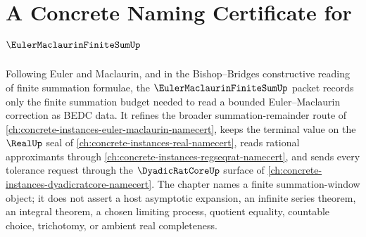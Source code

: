 \chapter{A Concrete Naming Certificate for $\EulerMaclaurinFiniteSumUp$}
\label{ch:concrete-instances-euler-maclaurin-finite-sum-namecert}

Following Euler and Maclaurin, and in the Bishop--Bridges constructive reading of finite summation formulae, the $\EulerMaclaurinFiniteSumUp$ packet records only the finite summation budget needed to read a bounded Euler--Maclaurin correction as BEDC data. It refines the broader summation-remainder route of \autoref{ch:concrete-instances-euler-maclaurin-namecert}, keeps the terminal value on the $\RealUp$ seal of \autoref{ch:concrete-instances-real-namecert}, reads rational approximants through \autoref{ch:concrete-instances-regseqrat-namecert}, and sends every tolerance request through the $\DyadicRatCoreUp$ surface of \autoref{ch:concrete-instances-dyadicratcore-namecert}. The chapter names a finite summation-window object; it does not assert a host asymptotic expansion, an infinite series theorem, an integral theorem, a chosen limiting process, quotient equality, countable choice, trichotomy, or ambient real completeness.

